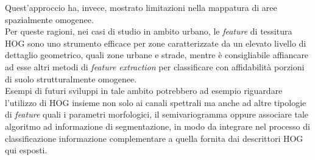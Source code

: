 Quest'approccio ha, invece, mostrato limitazioni nella mappatura di aree spazialmente omogenee.\\
Per queste ragioni, nei casi di studio in ambito urbano, le \emph{feature} di tessitura HOG sono uno strumento efficace per zone caratterizzate da un elevato livello di dettaglio geometrico, quali zone urbane e strade, mentre è consigliabile affiancare ad esse altri metodi di \emph{feature extraction} per classificare con affidabilità porzioni di suolo strutturalmente omogenee.\\
Esempi di futuri sviluppi in tale ambito potrebbero ad esempio riguardare l'utilizzo di HOG insieme non solo ai canali spettrali ma anche ad altre tipologie di \emph{feature} quali i parametri morfologici, il semivariogramma oppure associare tale algoritmo ad informazione di segmentazione, in modo da integrare nel processo di classificazione informazione complementare a quella fornita dai descrittori HOG qui esposti.


